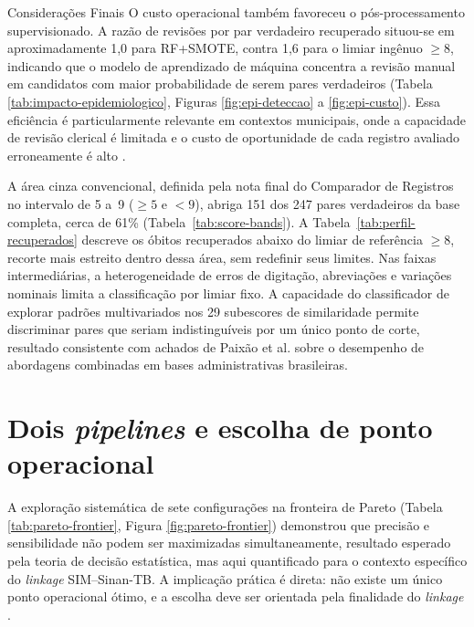 \begin{chapter}{Considerações Finais}
O custo operacional também favoreceu o pós-processamento supervisionado. A razão de revisões por par verdadeiro recuperado situou-se em aproximadamente 1,0 para RF+SMOTE, contra 1,6 para o limiar ingênuo $\geq 8$, indicando que o modelo de aprendizado de máquina concentra a revisão manual em candidatos com maior probabilidade de serem pares verdadeiros (Tabela \ref{tab:impacto-epidemiologico}, Figuras \ref{fig:epi-deteccao} a \ref{fig:epi-custo}). Essa eficiência é particularmente relevante em contextos municipais, onde a capacidade de revisão clerical é limitada e o custo de oportunidade de cada registro avaliado erroneamente é alto \cite{Coeli2021suboptimal}.

A área cinza convencional, definida pela nota final do Comparador de Registros no intervalo de 5 a~9 ($\geq 5$ e $< 9$), abriga 151 dos 247 pares verdadeiros da base completa, cerca de 61\% (Tabela~\ref{tab:score-bands}). A Tabela~\ref{tab:perfil-recuperados} descreve os óbitos recuperados abaixo do limiar de referência $\geq 8$, recorte mais estreito dentro dessa área, sem redefinir seus limites. Nas faixas intermediárias, a heterogeneidade de erros de digitação, abreviações e variações nominais limita a classificação por limiar fixo. A capacidade do classificador de explorar padrões multivariados nos 29 subescores de similaridade permite discriminar pares que seriam indistinguíveis por um único ponto de corte, resultado consistente com achados de Paixão et al. \citeyearpar{Paixao2017linkageevaluation} sobre o desempenho de abordagens combinadas em bases administrativas brasileiras.

\section{Dois \textit{pipelines} e escolha de ponto operacional}
\label{sec:cap6-dois-pipelines}

A exploração sistemática de sete configurações na fronteira de Pareto (Tabela \ref{tab:pareto-frontier}, Figura \ref{fig:pareto-frontier}) demonstrou que precisão e sensibilidade não podem ser maximizadas simultaneamente, resultado esperado pela teoria de decisão estatística, mas aqui quantificado para o contexto específico do \textit{linkage} SIM--Sinan-TB. A implicação prática é direta: não existe um único ponto operacional ótimo, e a escolha deve ser orientada pela finalidade do \textit{linkage} \cite{Harron2017linkagequality}.


\end{chapter}
